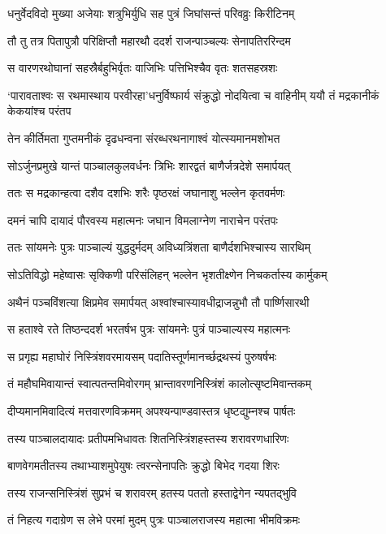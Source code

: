 \twolineshloka
{धनुर्वेदविदो मुख्या अजेयाः शत्रुभिर्युधि}
{सह पुत्रं जिघांसन्तं परिवव्रुः किरीटिनम्}


\twolineshloka
{तौ तु तत्र पितापुत्रौ परिक्षिप्तौ महारथौ}
{ददर्श राजन्पाञ्चल्यः सेनापतिररिन्दम}


\twolineshloka
{स वारणरथोघानां सहस्रैर्बहुभिर्वृतः}
{वाजिभिः पत्तिभिश्चैव वृतः शतसहस्रशः}


\twolineshloka
{`पारावताश्वः स रथमास्थाय परवीरहा'धनुर्विष्फार्य संक्रुद्धो नोदयित्वा च वाहिनीम्}
{ययौ तं मद्रकानीकं केकयांश्च परंतप}


\twolineshloka
{तेन कीर्तिमता गुप्तमनीकं दृढधन्वना}
{संरब्धरथनागाश्वं योत्स्यमानमशोभत}


\twolineshloka
{सोऽर्जुनप्रमुखे यान्तं पाञ्चालकुलवर्धनः}
{त्रिभिः शारद्वतं बाणैर्जत्रदेशे समार्पयत्}


\twolineshloka
{ततः स मद्रकान्हत्वा दशैव दशभिः शरैः}
{पृष्ठरक्षं जघानाशु भल्लेन कृतवर्मणः}


\twolineshloka
{दमनं चापि दायादं पौरवस्य महात्मनः}
{जघान विमलाग्नेण नाराचेन परंतपः}


\twolineshloka
{ततः सांयमनेः पुत्रः पाञ्चाल्यं युद्धदुर्मदम्}
{अविध्यत्रिंशता बाणैर्दशभिश्चास्य सारथिम्}


\twolineshloka
{सोऽतिविद्धो महेष्वासः सृक्किणी परिसंलिहन्}
{भल्लेन भृशतीक्ष्णेन निचकर्तास्य कार्मुकम्}


\twolineshloka
{अथैनं पञ्चविंशत्या क्षिप्रमेव समार्पयत्}
{अश्वांश्चास्यावधीद्राजन्नुभौ तौ पार्ष्णिसारथी}


\twolineshloka
{स हताश्वे रते तिष्ठन्ददर्श भरतर्षभ}
{पुत्रः सांयमनेः पुत्रं पाञ्चाल्यस्य महात्मनः}


\twolineshloka
{स प्रगृह्य महाघोरं निस्त्रिंशवरमायसम्}
{पदातिस्तूर्णमानर्च्छद्रथस्यं पुरुषर्षभः}


\twolineshloka
{तं महौघमिवायान्तं स्वात्पतन्तमिवोरगम्}
{भ्रान्तावरणनिस्त्रिंशं कालोत्सृष्टमिवान्तकम्}


\twolineshloka
{दीप्यमानमिवादित्यं मत्तवारणविक्रमम्}
{अपश्यन्पाण्डवास्तत्र धृष्टद्युम्नश्च पार्षतः}


\twolineshloka
{तस्य पाञ्चालदायादः प्रतीपमभिधावतः}
{शितनिस्त्रिंशहस्तस्य शरावरणधारिणः}


\twolineshloka
{बाणवेगमतीतस्य तथाभ्याशमुपेयुषः}
{त्वरन्सेनापतिः क्रुद्धो बिभेद गदया शिरः}


\twolineshloka
{तस्य राजन्सनिस्त्रिंशं सुप्रभं च शरावरम्}
{हतस्य पततो हस्ताद्वेगेन न्यपतद्भुवि}


\twolineshloka
{तं निहत्य गदाग्रेण स लेभे परमां मुदम्}
{पुत्रः पाञ्चालराजस्य महात्मा भीमविक्रमः}


